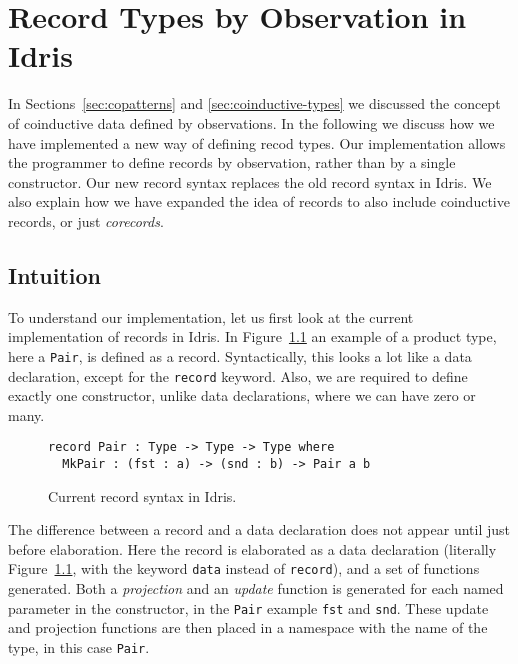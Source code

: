 \chapter{Record Types by Observation in Idris}
\label{app:record-types-observ}
In Sections~\ref{sec:copatterns} and \ref{sec:coinductive-types} we discussed
the concept of coinductive data defined by observations. In the following we
discuss how we have implemented a new way of defining recod types. Our
implementation allows the programmer to define records by observation, rather
than by a single constructor. Our new record syntax replaces the old record
syntax in Idris. We also explain how we have expanded the idea of records to
also include coinductive records, or just \emph{corecords}.

\section{Intuition}
To understand our implementation, let us first look at the current
implementation of records in Idris. In Figure~\ref{fig:records_in_idris} an
example of a product type, here a \texttt{Pair}, is defined as a
record. Syntactically, this looks a lot like a data declaration, except for the
\texttt{record} keyword. Also, we are required to define exactly one
constructor, unlike data declarations, where we can have zero or many.

\begin{figure}[h]
\begin{lstlisting}
record Pair : Type -> Type -> Type where
  MkPair : (fst : a) -> (snd : b) -> Pair a b
\end{lstlisting}
  \caption{Current record syntax in Idris.}
  \label{fig:records_in_idris}
\end{figure}

The difference between a record and a data declaration does not appear until just
before elaboration. Here the record is elaborated as a data declaration
(literally Figure~\ref{fig:records_in_idris}, with the keyword \texttt{data}
instead of \texttt{record}), and a set of functions generated. Both a
\emph{projection} and an \emph{update} function is generated for each named
parameter in the constructor, in the \texttt{Pair} example \texttt{fst} and
\texttt{snd}. These update and projection functions are then placed in a namespace with the
name of the type, in this case \texttt{Pair}. 

